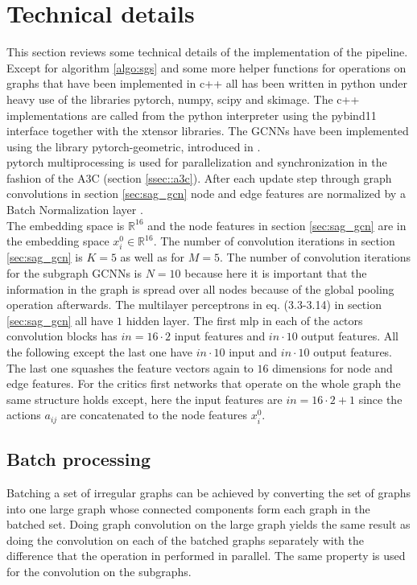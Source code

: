 \section{Technical details}\label{sec:tech}
This section reviews some technical details of the implementation of the pipeline. Except for algorithm \ref{algo:sgs} and some more helper functions for operations on graphs that have been implemented in c++ all has been written in python under heavy use of the libraries pytorch, numpy, scipy and skimage. The c++ implementations are called from the python interpreter using the pybind11 interface together with the xtensor libraries. The GCNNs have been implemented using the library pytorch-geometric, introduced in \cite{Fey/Lenssen/2019}.\\
pytorch multiprocessing is used for parallelization and synchronization in the fashion of the A3C (section \ref{ssec::a3c}). After each update step through graph convolutions in section \ref{sec:sag_gcn} node and edge features are normalized by a Batch Normalization layer \cite{ioffe2015batch}.\\
The embedding space is $\mathbb{R}^{16}$ and the node features in section \ref{sec:sag_gcn} are in the embedding space $x_{i}^0 \in \mathbb{R}^{16}$. The number of convolution iterations in section \ref{sec:sag_gcn} is $K=5$ as well as for $M=5$. The number of convolution iterations for the subgraph GCNNs is $N=10$ because here it is important that the information in the graph is spread over all nodes because of the global pooling operation afterwards. The multilayer perceptrons in eq. (3.3-3.14) in section \ref{sec:sag_gcn} all have $1$ hidden layer. The first mlp in each of the actors convolution blocks has $in=16\cdot 2$ input features and $in\cdot 10$ output features. All the following except the last one have $in\cdot 10$ input and $in\cdot 10$ output features. The last one squashes the feature vectors again to $16$ dimensions for node and edge features. For the critics first networks that operate on the whole graph the same structure holds except, here the input features are $in=16\cdot 2 + 1$ since the actions $a_{ij}$ are concatenated to the node features $x_{i}^0$.


\subsection{Batch processing}\label{ssec:batchp}
Batching a set of irregular graphs can be achieved by converting the set of graphs into one large graph whose connected components form each graph in the batched set. Doing graph convolution on the large graph yields the same result as doing the convolution on each of the batched graphs separately with the difference that the operation in performed in parallel. The same property is used for the convolution on the subgraphs.